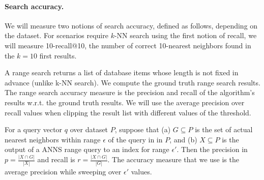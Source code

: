 \paragraph{Search accuracy.}

We will measure two notions of search accuracy, defined as follows,
depending on the dataset. For scenarios require $k$-NN search using
the first notion of recall, we will measure 10-recall@10, \ie 
the number of correct 10-nearest neighbors found in the $k=10$ first results.

\iffalse 

\begin{definition}[{\bf \recall{k}{k'}}]
  \label{def:recall}
  For a query vector $q$ over dataset $P$, suppose that (a) $G
  \subseteq P$ is the set of actual $k$ nearest neighbors in $P$, and
  (b) $X \subseteq P$ is the output of a $k'$-ANNS query to an index
  for $k' \geq k$ nearest neighbors. Then the \recall{k}{k'} for the
  index for query $q$ is $\frac{|X \cap G|}{k}$. Recall for a set of
  queries refers to the average recall over all queries.
\end{definition}

\fi


A range search returns a list of database items whose length is not fixed in advance (unlike k-NN search).
We compute the ground truth range search results. 
The range search accuracy measure is the precision and recall of the algorithm's results w.r.t. the ground truth results.
We will use the average precision over recall values when clipping the result list with different values of the threshold.


\iffalse 

\begin{definition}
  \label{def:rangeaccuracy}
  For a query vector $q$ over dataset $P$, suppose that (a) $G
  \subseteq P$ is the set of actual nearest neighbors within range $\epsilon$ 
  of the query in in $P$, and
  (b) $X \subseteq P$ is the output of a ANNS range query to an index
  for range $\epsilon'$. 
  Then the precision in $p=\frac{|X \cap G|}{|X|}$ and recall is $r=\frac{|X \cap G|}{|G|}$. 
  The accuracy measure that we use is the average precision while sweeping over $\epsilon'$ values.
\end{definition}


